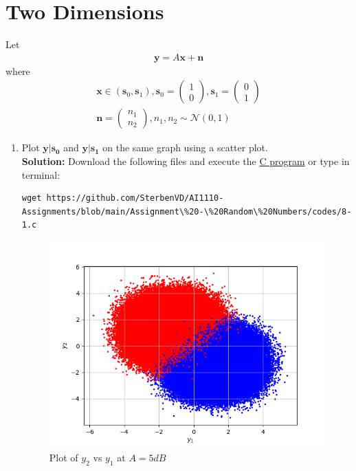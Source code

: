\documentclass[journal,12pt,twocolumn]{IEEEtran}
\let\vec\mathbf
\numberwithin{equation}{section}
\renewcommand\thesection{\arabic{section}}
\providecommand{\brak}[1]{\ensuremath{\left(#1\right)}}
\newcommand{\myvec}[1]{\ensuremath{\begin{pmatrix}#1\end{pmatrix}}}
\providecommand{\gauss}[2]{\mathcal{N}\ensuremath{\left(#1,#2\right)}}
\providecommand{\gitlink}[2]{{\color{blue}\href{https://github.com/SterbenVD/AI1110-Assignments/blob/main/Assignment\%20-\%20Random\%20Numbers/#1}{#2}}}
\newcommand{\solution}{\noindent \textbf{\\ Solution: }}
\begin{document}
\section{Two Dimensions}
\noindent Let
\begin{align}
    \vec{y} = A\vec{x} + \vec{n}
\end{align}
where
\begin{align}
    \vec{x} \in \brak{\vec{s}_0, \vec{s}_1}, \vec{s}_0 = \myvec{1 \\ 0}, \vec{s}_1 = \myvec{0 \\ 1} \\
    \vec{n} = \myvec{n_1                                          \\ n_2}, n_1, n_2 \sim \gauss{0}{1}
\end{align}
\begin{enumerate}[label=\thesection.\arabic*
        ,ref=\thesection.\theenumi]
    \item Plot $\vec{y}|\vec{s_0}$ and $\vec{y}|\vec{s_1}$ on the same graph using a scatter plot.
          \solution Download the following files and execute the \gitlink{codes/8-1.c}{C program} or type in terminal:
          \begin{lstlisting}
wget https://github.com/SterbenVD/AI1110-Assignments/blob/main/Assignment\%20-\%20Random\%20Numbers/codes/8-1.c
                    \end{lstlisting}
          \begin{figure}[H]
              \centering
              \includegraphics[width = \columnwidth]{../figs/8-1.png}
              \caption{Plot of $y_2$ vs $y_1$ at $A= 5dB$}

\end{figure}
\end{enumerate}
\end{document}
